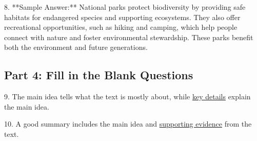 \documentclass[12pt]{article}
\begin{document}
8. **Sample Answer:** National parks protect biodiversity by providing safe habitats for endangered species and supporting ecosystems. They also offer recreational opportunities, such as hiking and camping, which help people connect with nature and foster environmental stewardship. These parks benefit both the environment and future generations.

\subsection*{Part 4: Fill in the Blank Questions}

9. The main idea tells what the text is mostly about, while \underline{key details} explain the main idea.

10. A good summary includes the main idea and \underline{supporting evidence} from the text.
\end{document}
